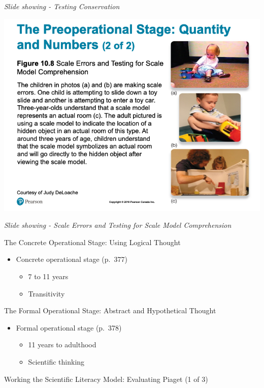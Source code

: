 \documentclass[
]{book}
\providecommand{\tightlist}{%
  \setlength{\itemsep}{0pt}\setlength{\parskip}{0pt}}
\begin{document}
\emph{Slide showing - Testing Conservation}

\includegraphics{assets/unit_3/slide_26.png}

\emph{Slide showing - Scale Errors and Testing for Scale Model Comprehension}

The Concrete Operational Stage: Using Logical Thought

\begin{itemize}
\tightlist
\item
  Concrete operational stage (p.~377)

  \begin{itemize}
  \tightlist
  \item
    7 to 11 years
  \item
    Transitivity
  \end{itemize}
\end{itemize}

The Formal Operational Stage: Abstract and Hypothetical Thought

\begin{itemize}
\tightlist
\item
  Formal operational stage (p.~378)

  \begin{itemize}
  \tightlist
  \item
    11 years to adulthood
  \item
    Scientific thinking
  \end{itemize}
\end{itemize}

Working the Scientific Literacy Model: Evaluating Piaget (1 of 3)
\end{document}
